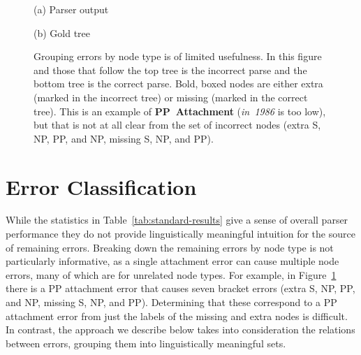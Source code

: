 \begin{figure}
\begin{center}

(a) Parser output
\vspace{3mm}


(b) Gold tree
\end{center}
\derivspace
\caption{
	\label{fig:PP-attachment}
	Grouping errors by node type is of limited usefulness.  In this figure and
	those that follow the top tree is the incorrect parse and the bottom tree is
	the correct parse.  Bold, boxed nodes are either extra (marked in the
	incorrect tree) or missing (marked in the correct tree).  This is an example
	of \textbf{PP~Attachment} (\emph{in~1986} is too low), but that is not at all
	clear from the set of incorrect nodes (extra S, NP, PP, and NP, missing S,
	NP, and PP).
}
\derivaftercompress
\end{figure}

\section{Error Classification}

While the statistics in Table~\ref{tab:standard-results} give a sense of
overall parser performance they do not provide linguistically meaningful
intuition for the source of remaining errors.  Breaking down the remaining
errors by node type is not particularly informative, as a single attachment
error can cause multiple node errors, many of which are for unrelated node
types.  For example, in Figure~\ref{fig:PP-attachment} there is a PP attachment
error that causes seven bracket errors (extra S, NP, PP, and NP, missing S,
NP, and PP).  Determining that these correspond to a PP attachment error from
just the labels of the missing and extra nodes is difficult.  In contrast, the
approach we describe below takes into consideration the relations between
errors, grouping them into linguistically meaningful sets.

